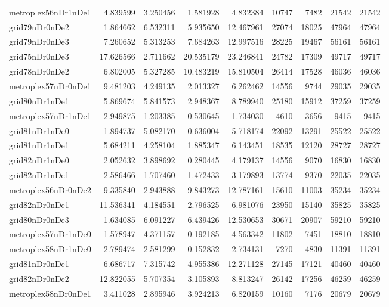 \begin{longtable}{|l|r|r|r|r|r|r|r|r|}
metroplex56nDr1nDe1 & 4.839599 & 3.250456 & 1.581928 & 4.832384 & 10747 & 7482 & 21542 & 21542 \\
grid79nDr0nDe2 & 1.864662 & 6.532311 & 5.935650 & 12.467961 & 27074 & 18025 & 47964 & 47964 \\
grid79nDr0nDe3 & 7.260652 & 5.313253 & 7.684263 & 12.997516 & 28225 & 19467 & 56161 & 56161 \\
grid75nDr0nDe3 & 17.626566 & 2.711662 & 20.535179 & 23.246841 & 24782 & 17309 & 49717 & 49717 \\
grid78nDr0nDe2 & 6.802005 & 5.327285 & 10.483219 & 15.810504 & 26414 & 17528 & 46036 & 46036 \\
metroplex57nDr0nDe1 & 9.481203 & 4.249135 & 2.013327 & 6.262462 & 14556 & 9744 & 29035 & 29035 \\
grid80nDr1nDe1 & 5.869674 & 5.841573 & 2.948367 & 8.789940 & 25180 & 15912 & 37259 & 37259 \\
metroplex57nDr1nDe1 & 2.949875 & 1.203385 & 0.530645 & 1.734030 & 4610 & 3656 & 9415 & 9415 \\
grid81nDr1nDe0 & 1.894737 & 5.082170 & 0.636004 & 5.718174 & 22092 & 13291 & 25522 & 25522 \\
grid81nDr1nDe1 & 5.684211 & 4.258104 & 1.885347 & 6.143451 & 18535 & 12120 & 28727 & 28727 \\
grid82nDr1nDe0 & 2.052632 & 3.898692 & 0.280445 & 4.179137 & 14556 & 9070 & 16830 & 16830 \\
grid82nDr1nDe1 & 2.586466 & 1.707460 & 1.472433 & 3.179893 & 13774 & 9370 & 22035 & 22035 \\
metroplex56nDr0nDe2 & 9.335840 & 2.943888 & 9.843273 & 12.787161 & 15610 & 11003 & 35234 & 35234 \\
grid82nDr0nDe1 & 11.536341 & 4.184551 & 2.796525 & 6.981076 & 23950 & 15140 & 35825 & 35825 \\
grid80nDr0nDe3 & 1.634085 & 6.091227 & 6.439426 & 12.530653 & 30671 & 20907 & 59210 & 59210 \\
metroplex57nDr1nDe0 & 1.578947 & 4.371157 & 0.192185 & 4.563342 & 11802 & 7451 & 18810 & 18810 \\
metroplex58nDr1nDe0 & 2.789474 & 2.581299 & 0.152832 & 2.734131 & 7270 & 4830 & 11391 & 11391 \\
grid81nDr0nDe1 & 6.686717 & 7.315742 & 4.955386 & 12.271128 & 27145 & 17121 & 40460 & 40460 \\
grid82nDr0nDe2 & 12.822055 & 5.707354 & 3.105893 & 8.813247 & 26142 & 17256 & 46259 & 46259 \\
metroplex58nDr0nDe1 & 3.411028 & 2.895946 & 3.924213 & 6.820159 & 10160 & 7176 & 20679 & 20679 \\

\end{longtable}
